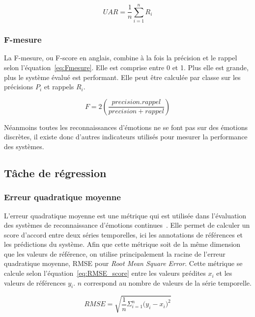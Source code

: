 \begin{equation}
  UAR = \dfrac{1}{n} \sum_{i=1}^n R_i
  \label{eq:UAR}
\end{equation}

\subsubsection{F-mesure}

La F-mesure, ou F-score en anglais, combine à la fois la précision et le rappel selon l'équation~\ref{eq:Fmesure}. Elle est comprise entre 0 et 1. Plus elle est grande, plus le système évalué est performant. Elle peut être calculée par classe sur les précisions $P_i$ et rappels $R_i$.

\begin{equation}
  F = 2 \left( \frac{precision.rappel}{precision+rappel} \right)
  \label{eq:Fmesure}
\end{equation}

Néanmoins toutes les reconnaissances d'émotions ne se font pas sur des émotions discrètes, il existe donc d'autres indicateurs utilisés pour mesurer la performance des systèmes.

\subsection{Tâche de régression}

\subsubsection{Erreur quadratique moyenne}
L'erreur quadratique moyenne est une métrique qui est utilisée dans l'évaluation des systèmes de reconnaissance d'émotions continues~\cite{AVEC2017}. Elle permet de calculer un score d'accord entre deux séries temporelles, ici les annotations de références et les prédictions du système. Afin que cette métrique soit de la même dimension que les valeurs de référence, on utilise principalement la racine de l'erreur quadratique moyenne, RMSE pour \textit{Root Mean Square Error}. Cette métrique se calcule selon l'équation~\ref{eq:RMSE_score} entre les valeurs prédites $x_i$  et les valeurs de références $y_i$. $n$ correspond au nombre de valeurs de la série temporelle.

\begin{equation}
    RMSE = \sqrt{\frac{1}{n}\Sigma_{i=1}^{n}{\Big(y_i - x_i\Big)^2}}
\label{eq:RMSE_score}
\end{equation}

